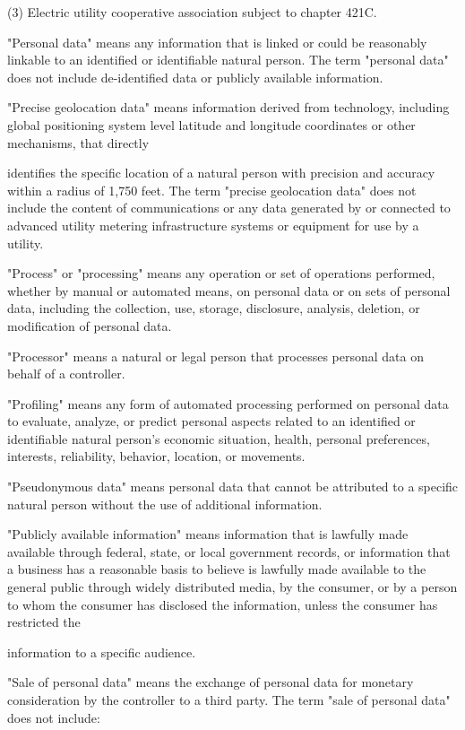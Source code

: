      (3)  Electric utility cooperative association subject to chapter 421C.

     "Personal data" means any information that is linked or could be reasonably linkable to an identified or identifiable natural person.  The term "personal data" does not include de-identified data or publicly available information.

     "Precise geolocation data" means information derived from technology, including global positioning system level latitude and longitude coordinates or other mechanisms, that directly

identifies the specific location of a natural person with precision and accuracy within a radius of 1,750 feet.  The term "precise geolocation data" does not include the content of communications or any data generated by or connected to advanced utility metering infrastructure systems or equipment for use by a utility.

     "Process" or "processing" means any operation or set of operations performed, whether by manual or automated means, on personal data or on sets of personal data, including the collection, use, storage, disclosure, analysis, deletion, or modification of personal data.

     "Processor" means a natural or legal person that processes personal data on behalf of a controller.

     "Profiling" means any form of automated processing performed on personal data to evaluate, analyze, or predict personal aspects related to an identified or identifiable natural person's economic situation, health, personal preferences, interests, reliability, behavior, location, or movements.

     "Pseudonymous data" means personal data that cannot be attributed to a specific natural person without the use of additional information.

     "Publicly available information" means information that is lawfully made available through federal, state, or local government records, or information that a business has a reasonable basis to believe is lawfully made available to the general public through widely distributed media, by the consumer, or by a person to whom the consumer has disclosed the information, unless the consumer has restricted the

information to a specific audience.

     "Sale of personal data" means the exchange of personal data for monetary consideration by the controller to a third party.  The term "sale of personal data" does not include:

